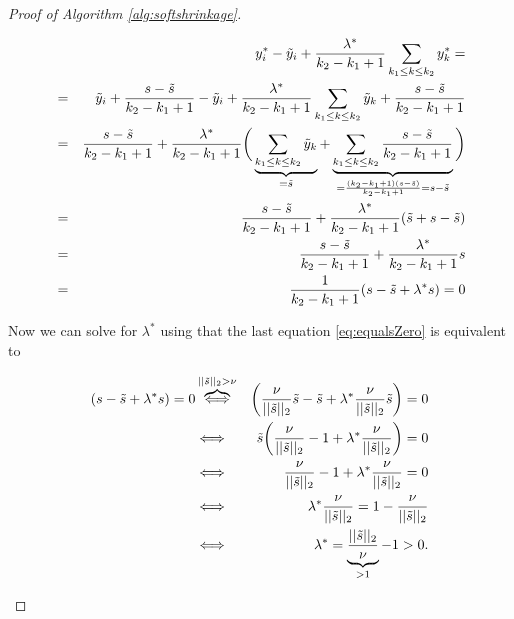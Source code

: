 \begin{proof}[Proof of Algorithm \ref{alg:softshrinkage}]
\begin{enumerate}
                        \begin{eqnarray}
                            &&y^{\ast}_{i} - \tilde{y}_{i} + \frac{\lambda^{\ast}}{k_{2} - k_{1} + 1} \sum_{k_{1} \le k \le k_{2}} y^{\ast}_{k} = \notag \\
                            &=& \tilde{y}_{i} + \frac{s - \tilde{s}}{k_{2} - k_{1} + 1} - \tilde{y}_{i} + \frac{\lambda^{\ast}}{k_{2} - k_{1} + 1} \sum_{k_{1} \le k \le k_{2}} \tilde{y}_{k} + \frac{s - \tilde{s}}{k_{2} - k_{1} + 1} \notag \\
                            &=& \frac{s - \tilde{s}}{k_{2} - k_{1} + 1} + \frac{\lambda^{\ast}}{k_{2} - k_{1} + 1} \bigg( \underbrace{\sum_{k_{1} \le k \le k_{2}} \tilde{y}_{k}}_{= \tilde{s}} + \underbrace{\sum_{k_{1} \le k \le k_{2}} \frac{s - \tilde{s}}{k_{2} - k_{1} + 1}}_{= \frac{(k_{2} - k_{1} + 1) (s - \tilde{s})}{k_{2} - k_{1} + 1} = s - \tilde{s}} \bigg) \notag \\
                            &=& \frac{s - \tilde{s}}{k_{2} - k_{1} + 1} + \frac{\lambda^{\ast}}{k_{2} - k_{1} + 1} (\tilde{s} + s - \tilde{s}) \notag \\
                            &=& \frac{s - \tilde{s}}{k_{2} - k_{1} + 1} + \frac{\lambda^{\ast}}{k_{2} - k_{1} + 1}s \notag \\
                            &=& \frac{1}{k_{2} - k_{1} + 1} (s - \tilde{s} + \lambda^{\ast}s) = 0 \label{eq:equalsZero}
                        \end{eqnarray}

                    Now we can solve for $\lambda^{\ast}$ using that the last equation \ref{eq:equalsZero} is equivalent to

                        \begin{eqnarray}
                            (s - \tilde{s} + \lambda^{\ast} s) = 0 &\overbrace{\Longleftrightarrow}^{||\tilde{s}||_{2} > \nu}& \bigg(\frac{\nu}{||\tilde{s}||_{2}}\tilde{s} - \tilde{s} + \lambda^{\ast} \frac{\nu}{||\tilde{s}||_{2}}\tilde{s} \bigg) = 0 \notag \\
                            &\Longleftrightarrow& \tilde{s} \bigg( \frac{\nu}{||\tilde{s}||_{2}} - 1 + \lambda^{\ast} \frac{\nu}{||\tilde{s}||_{2}} \bigg) = 0 \notag \\
                            &\Longleftrightarrow& \frac{\nu}{||\tilde{s}||_{2}} - 1 + \lambda^{\ast} \frac{\nu}{||\tilde{s}||_{2}} = 0 \notag \\
                            &\Longleftrightarrow& \lambda^{\ast} \frac{\nu}{||\tilde{s}||_{2}} = 1 - \frac{\nu}{||\tilde{s}||_{2}} \notag \\
                            &\Longleftrightarrow& \lambda^{\ast} = \underbrace{\frac{||\tilde{s}||_{2}}{\nu}}_{> 1} - 1 > 0. \notag
                        \end{eqnarray}


\end{enumerate}
\end{proof}
